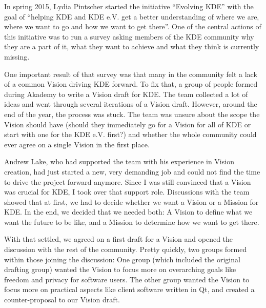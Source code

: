 

\noindent{}In spring 2015, Lydia Pintscher started the initiative ``Evolving KDE'' with the goal of ``helping KDE and KDE e.V. get a better understanding of where we are, where we want to go and how we want to get there''. One of the central actions of this initiative was to run a survey asking members of the KDE community why they are a part of it, what they want to achieve and what they think is currently missing.

One important result of that survey was that many in the community felt a lack of a common Vision driving KDE forward. To fix that, a group of people formed during Akademy to write a Vision draft for KDE. The team collected a lot of ideas and went through several iterations of a Vision draft. However, around the end of the year, the process was stuck. The team was unsure about the scope the Vision should have (should they immediately go for a Vision for all of KDE or start with one for the KDE e.V. first?) and whether the whole community could ever agree on a single Vision in the first place.

Andrew Lake, who had supported the team with his experience in Vision creation, had just started a new, very demanding job and could not find the time to drive the project forward anymore. Since I was still convinced that a Vision was crucial for KDE, I took over that support role. Discussions with the team showed that at first, we had to decide whether we want a Vision or a Mission for KDE. In the end, we decided that we needed both: A Vision to define what we want the future to be like, and a Mission to determine how we want to get there.

With that settled, we agreed on a first draft for a Vision and opened the discussion with the rest of the community. Pretty quickly, two groups formed within those joining the discussion: One group (which included the original drafting group) wanted the Vision to focus more on overarching goals like freedom and privacy for software users. The other group wanted the Vision to focus more on practical aspects like client software written in Qt, and created a counter-proposal to our Vision draft.

